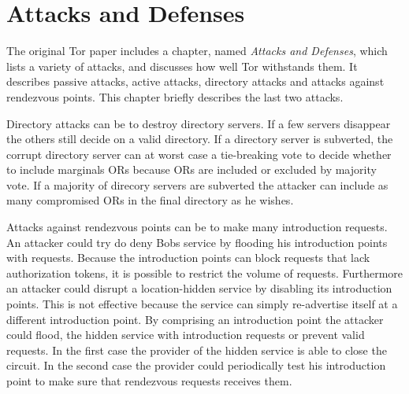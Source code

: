 \section{Attacks and Defenses}
The original Tor paper includes a chapter, named \textit{Attacks and Defenses}, which lists a variety of attacks, and discusses how well Tor withstands them. It describes passive attacks, active attacks, directory attacks and attacks against rendezvous points. This chapter briefly describes the last two attacks. 

Directory attacks can be to destroy directory servers. If a few servers disappear the others still decide on a valid directory. If a directory server is subverted, the corrupt directory server can at worst case a tie-breaking vote to decide whether to include marginals ORs because ORs are included or excluded by majority vote. If a majority of direcory servers are subverted the attacker can include as many compromised ORs in the final directory as he wishes. 

Attacks against rendezvous points can be to make many introduction requests. An attacker could try do deny Bobs service by flooding his introduction points with requests. Because the introduction points can block requests that lack authorization tokens, it is possible to restrict the volume of requests. Furthermore an attacker could disrupt a location-hidden service by disabling its introduction points. This is not effective because the service can simply re-advertise itself at a different introduction point. By comprising an introduction point the attacker could flood, the hidden service with introduction requests or prevent valid requests. In the first case the provider of the hidden service is able to close the circuit. In the second case the provider could periodically test his introduction point to make sure that rendezvous requests receives them.